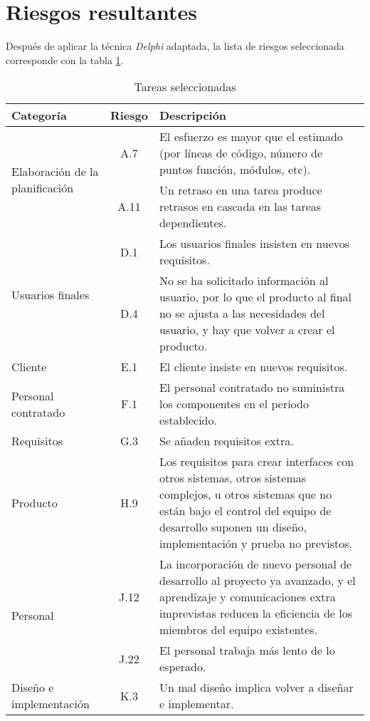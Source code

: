 \documentclass[11pt,a4paper,spanish,twoside]{book}
\begin{document}
\section{Riesgos resultantes}
Después de aplicar la técnica \emph{Delphi} adaptada, la lista de riesgos
seleccionada corresponde con la tabla \ref{Tab:tar_sel}.
\begin{table}[!ht]
  \centering
  \begin{tabular}{|p{3.5cm}|c|p{6.5cm}|}
    \hline
    \textbf{Categoría} & \textbf{Riesgo} & \textbf{Descripción} \\
    \hline\hline
    \multirow{2}{3.5cm}{Elaboración de la planificación}
    & A.7 & El esfuerzo es mayor que el estimado (por líneas de código,
    número de puntos función, módulos, etc). \\  
    \cline{2-3}
    & A.11 & Un retraso en una tarea produce retrasos en cascada en las
    tareas dependientes. \\
    \hline \hline
    \multirow{2}{3cm}{Usuarios finales}
    & D.1 & Los usuarios finales insisten en nuevos requisitos.\\
    \cline{2-3}
    & D.4 & No se ha solicitado información al usuario, por lo que el
    producto al final  no se ajusta a las necesidades del usuario, y hay que
    volver a crear el producto.\\
    \hline \hline
    Cliente & E.1 & El cliente insiste en nuevos requisitos.\\
    \hline \hline
    Personal contratado & F.1 & El personal contratado no suministra los
    componentes en el periodo establecido.\\
    \hline \hline
    Requisitos & G.3 & Se añaden requisitos extra.\\
    \hline \hline
    Producto & H.9 &  Los requisitos para crear interfaces con otros 
    sistemas, otros sistemas complejos, u otros sistemas que no están bajo el 
    control del equipo de desarrollo suponen un diseño, implementación y
    prueba no previstos.\\ 
    \hline \hline
    \multirow{2}{3.5cm}{Personal}
    & J.12 & La incorporación de nuevo personal de desarrollo al proyecto ya
    avanzado, y el aprendizaje y comunicaciones extra imprevistas reducen la
    eficiencia de los miembros del equipo existentes.\\ 
    \cline{2-3}
    & J.22 & El personal trabaja más lento de lo esperado.\\
    \hline \hline
    \multirow{1}{3.5cm}{Diseño e implementación}
    & K.3 & Un mal diseño implica volver a diseñar e implementar.\\
   \hline
  \end{tabular}
  \caption{Tareas seleccionadas}
  \label{Tab:tar_sel}
\end{table}
\end{document}
